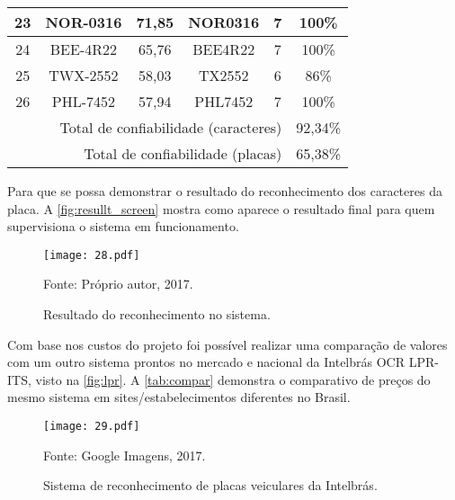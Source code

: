 \begin{table}[htb]
\begin{tabular}{c|c|c|c|c|c}
		\hline
		23 & NOR-0316 & 71,85 & NOR0316 & 7 & 100\% \\
		\hline
		24 & BEE-4R22 & 65,76 & BEE4R22 & 7 & 100\% \\
		\hline
		25 & TWX-2552 & 58,03 & TX2552 & 6 & 86\% \\
		\hline
		26 & PHL-7452 & 57,94 & PHL7452 & 7 & 100\% \\
		\hline
		\multicolumn{5}{r|}{Total de confiabilidade (caracteres)} & 92,34\% \\
		\multicolumn{5}{r|}{Total de confiabilidade (placas)} & 65,38\% \\  
		\hline \hline
	\end{tabular}
\end{table} 

Para que se possa demonstrar o resultado do reconhecimento dos caracteres da placa. A \autoref{fig:resullt_screen} mostra como aparece o resultado final para quem supervisiona o sistema em funcionamento.

\begin{figure}[htb]
	\centering
	\caption{{\footnotesize Resultado do reconhecimento no sistema.}}   %
	\label{fig:resullt_screen}
	\texttt{[image: 28.pdf]}
	
	{\footnotesize Fonte: Próprio autor, 2017.}
\end{figure}

Com base nos custos do projeto foi possível realizar uma comparação de valores com um outro sistema prontos no mercado e nacional da Intelbrás OCR LPR-ITS, visto na \autoref{fig:lpr}. A \autoref{tab:compar} demonstra o comparativo de preços do mesmo sistema em sites/estabelecimentos diferentes no Brasil.

\begin{figure}[htb]
	\centering
	\caption{{\footnotesize Sistema de reconhecimento de placas veiculares da Intelbrás.}}   %
	\label{fig:lpr}
	\texttt{[image: 29.pdf]}
	
	{\footnotesize Fonte: Google Imagens, 2017.}
\end{figure}

